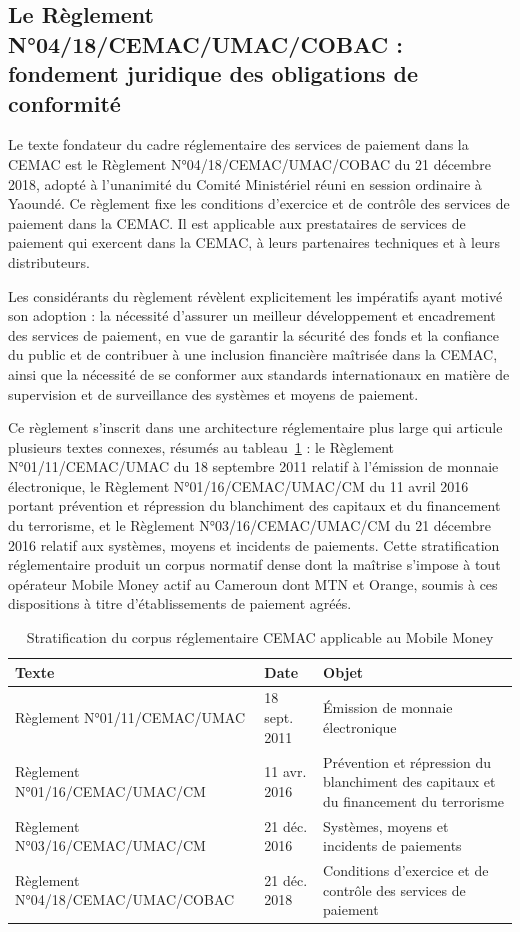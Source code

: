 \documentclass[11pt,a4paper,oneside]{report}
\theoremstyle{definition}
\theoremstyle{remark}
\begin{document}
\subsection{Le Règlement N°04/18/CEMAC/UMAC/COBAC : fondement juridique des obligations de conformité}

Le texte fondateur du cadre réglementaire des services de paiement dans la CEMAC est le Règlement N°04/18/CEMAC/UMAC/COBAC du 21 décembre 2018, adopté à l'unanimité du Comité Ministériel réuni en session ordinaire à Yaoundé. Ce règlement fixe les conditions d'exercice et de contrôle des services de paiement dans la CEMAC. Il est applicable aux prestataires de services de paiement qui exercent dans la CEMAC, à leurs partenaires techniques et à leurs distributeurs.

Les considérants du règlement révèlent explicitement les impératifs ayant motivé son adoption : la nécessité d'assurer un meilleur développement et encadrement des services de paiement, en vue de garantir la sécurité des fonds et la confiance du public et de contribuer à une inclusion financière maîtrisée dans la CEMAC, ainsi que la nécessité de se conformer aux standards internationaux en matière de supervision et de surveillance des systèmes et moyens de paiement.

Ce règlement s'inscrit dans une architecture réglementaire plus large qui articule plusieurs textes connexes, résumés au tableau~\ref{tab:textes-cemac} : le Règlement N°01/11/CEMAC/UMAC du 18 septembre 2011 relatif à l'émission de monnaie électronique, le Règlement N°01/16/CEMAC/UMAC/CM du 11 avril 2016 portant prévention et répression du blanchiment des capitaux et du financement du terrorisme, et le Règlement N°03/16/CEMAC/UMAC/CM du 21 décembre 2016 relatif aux systèmes, moyens et incidents de paiements. Cette stratification réglementaire produit un corpus normatif dense dont la maîtrise s'impose à tout opérateur Mobile Money actif au Cameroun  dont MTN et Orange, soumis à ces dispositions à titre d'établissements de paiement agréés.

\begin{table}[H]
\centering
\caption{Stratification du corpus réglementaire CEMAC applicable au Mobile Money}
\label{tab:textes-cemac}
\small
\begin{tabular}{p{3.6cm}p{2.4cm}p{6.4cm}}
\toprule
\textbf{Texte} & \textbf{Date} & \textbf{Objet} \\
\midrule
Règlement N°01/11/CEMAC/UMAC & 18 sept. 2011 & Émission de monnaie électronique \\
\addlinespace
Règlement N°01/16/CEMAC/UMAC/CM & 11 avr. 2016 & Prévention et répression du blanchiment des capitaux et du financement du terrorisme \\
\addlinespace
Règlement N°03/16/CEMAC/UMAC/CM & 21 déc. 2016 & Systèmes, moyens et incidents de paiements \\
\addlinespace
Règlement N°04/18/CEMAC/UMAC/COBAC & 21 déc. 2018 & Conditions d'exercice et de contrôle des services de paiement \\
\bottomrule
\end{tabular}
\end{table}
\end{document}
